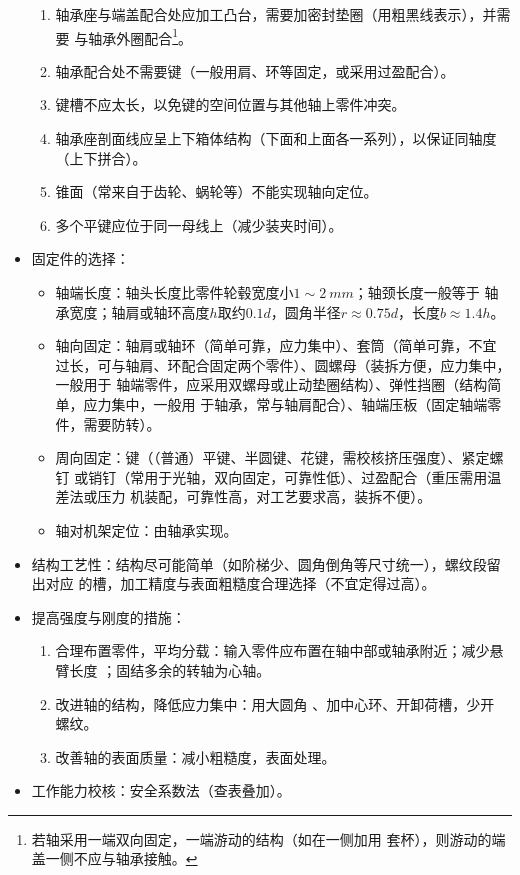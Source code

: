 \documentclass[12pt,a4paper]{article}
\newcommand{\tightlist}{\setlength{\parskip}{0pt}\setlength{\itemsep}{0pt}}
\newcommand{\hint}[1]{\textsf{（#1）}}
\newcommand{\minor}[1]{{\color{gray} #1}}
\begin{document}
\begin{itemize}
\begin{enumerate}
        \item 轴承座与端盖配合处应加工凸台，需要加密封垫圈\hint{用粗黑线表示}，并需要
        与轴承外圈配合\footnote{若轴采用一端双向固定，一端游动的结构\hint{如在一侧加用
        套杯}，则游动的端盖一侧不应与轴承接触。}。
        \item 轴承配合处不需要键\hint{一般用肩、环等固定，或采用过盈配合}。
        \item 键槽不应太长，以免键的空间位置与其他轴上零件冲突。
        \item 轴承座剖面线应呈上下箱体结构\hint{下面和上面各一系列}，以保证同轴度
        \hint{上下拼合}。
        \item 锥面\hint{常来自于齿轮、蜗轮等}不能实现轴向定位。
        \item 多个平键应位于同一母线上\hint{减少装夹时间}。
    \end{enumerate}
    \item 固定件的选择：
    \begin{itemize}\tightlist
        \item 轴端长度：轴头长度比零件轮毂宽度小$1\sim\SI{2}{mm}$；轴颈长度一般等于
        轴承宽度；轴肩或轴环高度$h$取约$0.1d$，圆角半径$r\approx0.75d$，长度$b
        \approx1.4h$。
        \item 轴向固定：轴肩或轴环\hint{简单可靠，应力集中}、套筒\hint{简单可靠，不宜
        过长，可与轴肩、环配合固定两个零件}、圆螺母\hint{装拆方便，应力集中，一般用于
        轴端零件，应采用双螺母或止动垫圈结构}、弹性挡圈\hint{结构简单，应力集中，一般用
        于轴承，常与轴肩配合}、轴端压板\hint{固定轴端零件，需要防转}。
        \item 周向固定：键\hint{（普通）平键、半圆键、花键，需校核挤压强度}、紧定螺钉
        或销钉\hint{常用于光轴，双向固定，可靠性低}、过盈配合\hint{重压需用温差法或压力
        机装配，可靠性高，对工艺要求高，装拆不便}。
        \item 轴对机架定位：由轴承实现。
    \end{itemize}
    \item 结构工艺性：结构尽可能简单\hint{如阶梯少、圆角倒角等尺寸统一}，螺纹段留出对应
    的槽，加工精度与表面粗糙度合理选择\hint{不宜定得过高}。
    \item 提高强度与刚度的措施：
    \begin{enumerate}\tightlist
        \item 合理布置零件，平均分载：输入零件应布置在轴中部或轴承附近；减少悬臂长度
        \minor{；固结多余的转轴为心轴}。
        \item 改进轴的结构，降低应力集中：用大圆角\minor{、加中心环、开卸荷槽，少开
        螺纹}。
        \item 改善轴的表面质量：减小粗糙度，表面处理。
    \end{enumerate}
    \item \minor{工作能力校核：安全系数法\hint{查表叠加}。}
\end{itemize}
\end{document}
